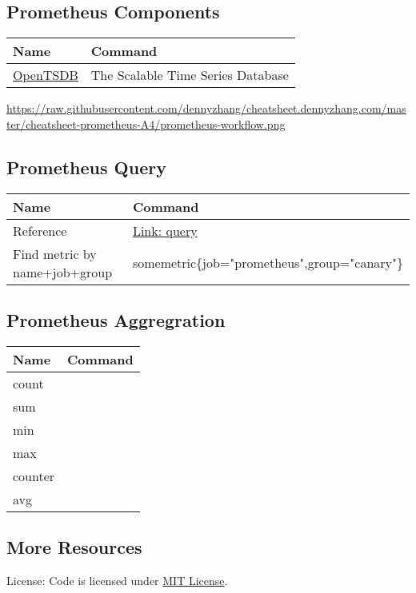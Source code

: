 \documentclass[8pt]{article}
\begin{document}
\subsection{Prometheus Components}
\label{sec:orgb115de9}
\begin{center}
\begin{tabular}{ll}
Name & Command\\
\hline
\href{http://opentsdb.net/}{OpenTSDB} & The Scalable Time Series Database\\
\end{tabular}
\end{center}

\href{https://cheatsheet.dennyzhang.com/cheatsheet-prometheus-A4}{https://raw.githubusercontent.com/dennyzhang/cheatsheet.dennyzhang.com/master/cheatsheet-prometheus-A4/prometheus-workflow.png}
\subsection{Prometheus Query}
\label{sec:orgb7e6fdb}
\begin{center}
\begin{tabular}{ll}
Name & Command\\
\hline
Reference & \href{https://prometheus.io/docs/prometheus/latest/querying/basics/}{Link: query}\\
Find metric by name+job+group & somemetric\{job="prometheus",group="canary"\}\\
\end{tabular}
\end{center}
\subsection{Prometheus Aggregration}
\label{sec:org9d058ac}
\begin{center}
\begin{tabular}{ll}
Name & Command\\
\hline
count & \\
sum & \\
min & \\
max & \\
counter & \\
avg & \\
\end{tabular}
\end{center}
\subsection{More Resources}
\label{sec:org72bf4f3}
License: Code is licensed under \href{https://www.dennyzhang.com/wp-content/mit\_license.txt}{MIT License}.
\end{document}
